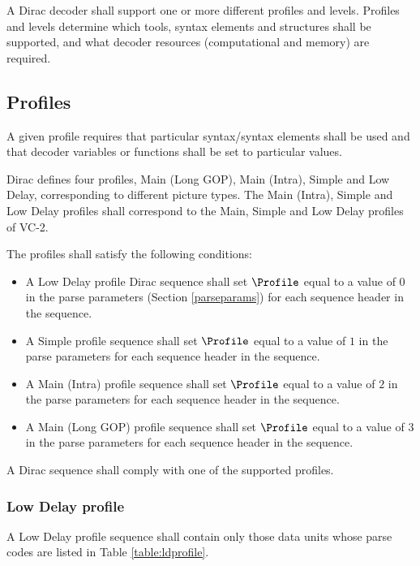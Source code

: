 \label{profilelevel}

A Dirac decoder shall support one or more different profiles and levels. 
Profiles and levels determine which tools, syntax elements and structures 
shall be supported, and what decoder resources (computational and memory) are required.

\subsection{Profiles}
\label{profiles}
A given profile requires that particular syntax/syntax elements shall 
be used and that decoder variables or functions shall be set to particular values.

Dirac defines four profiles, Main (Long GOP), Main (Intra), Simple and Low Delay, 
corresponding to different picture types. The Main (Intra), Simple and Low Delay
profiles shall correspond to the Main, Simple and Low Delay profiles of VC-2. 

The profiles shall satisfy the following conditions:
\begin{itemize}
\item A Low Delay profile Dirac sequence shall set $\Profile$ equal to a value of 
$0$ in the parse parameters (Section \ref{parseparams}) for each sequence header 
in the sequence.
\item A Simple profile sequence shall set $\Profile$ equal to a value of $1$ 
in the parse parameters for each sequence header in the sequence.
\item A Main (Intra) profile sequence shall set $\Profile$ equal to a value of $2$ 
in the parse parameters for each sequence header in the sequence.
\item A Main (Long GOP) profile sequence shall set $\Profile$ equal to a value of $3$ 
in the parse parameters for each sequence header in the sequence.
\end{itemize}

A Dirac sequence shall comply with one of the supported profiles.

\subsubsection{Low Delay profile}

A Low Delay profile sequence shall contain only those data units whose 
parse codes are listed in Table \ref{table:ldprofile}.

